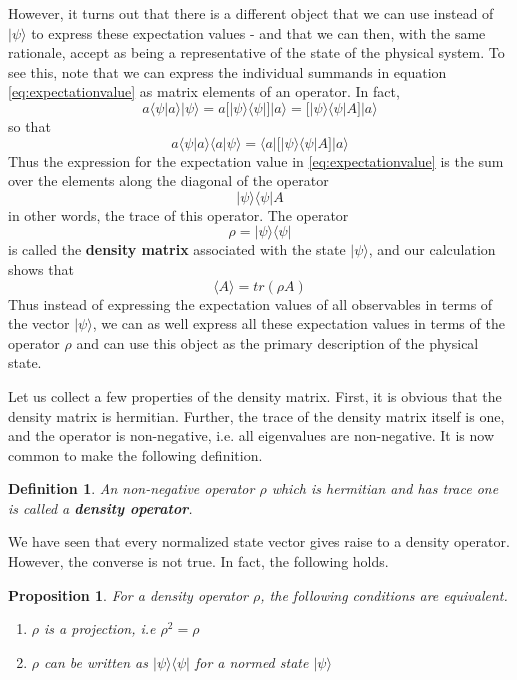 \documentclass[a4paper, draft]{article}
\theoremstyle{own}
\newtheorem{prop}[thm]{Proposition}
\newtheorem{defn}{Definition}[section]
\theoremstyle{remark}
\begin{document}
However, it turns out that there is a different object that we can use instead of $|\psi \rangle$ to express these expectation values - and that we can then, with the same rationale, accept as being a representative of the state of the physical system. To see this, note that we can express the individual summands in  equation \eqref{eq:expectationvalue} as matrix elements of an operator. In fact,
$$
a \langle \psi | a \rangle  | \psi \rangle   = a \big[ |\psi \rangle \langle \psi |\big] |a \rangle 
=  \big[ |\psi \rangle \langle \psi | A \big] |a \rangle 
$$
so that
$$
a \langle \psi | a \rangle \langle a | \psi \rangle  = 
\langle a | \big[ |\psi \rangle \langle \psi | A \big] 
|a \rangle
$$
Thus the expression for the expectation value in \eqref{eq:expectationvalue} is the sum over the elements along the diagonal of the operator
$$
|\psi \rangle \langle \psi | A
$$
in other words, the trace of this operator. The operator 
$$
\rho = |\psi \rangle \langle \psi |
$$
is called the {\bf density matrix} associated with the state $|\psi \rangle$, and our calculation shows that 
$$
\langle A \rangle = tr(\rho A)
$$
Thus instead of expressing the expectation values of all observables in terms of the vector $|\psi \rangle$, we can as well express all these expectation values in terms of the operator $\rho$ and can use this object as the primary description of the physical state.

Let us collect a few properties of the density matrix. First, it is obvious that the density matrix is hermitian. Further, the trace of the density matrix itself is one, and the operator is non-negative, i.e. all eigenvalues are non-negative. It is now common to make the following definition.

\begin{defn}
An non-negative operator $\rho$ which is hermitian and has trace one is called a {\bf density operator}.
\end{defn}

We have seen that every normalized state vector gives raise to a density operator. However, the converse is not true. In fact, the following holds.

\begin{prop}
For a density operator $\rho$, the following conditions are equivalent.
\begin{enumerate}
	\item $\rho$ is a projection, i.e $\rho^2 = \rho$
	\item $\rho$ can be written as $|\psi \rangle \langle \psi |$ for a normed state $|\psi \rangle$	
\end{enumerate}
\end{prop}
\end{document}
